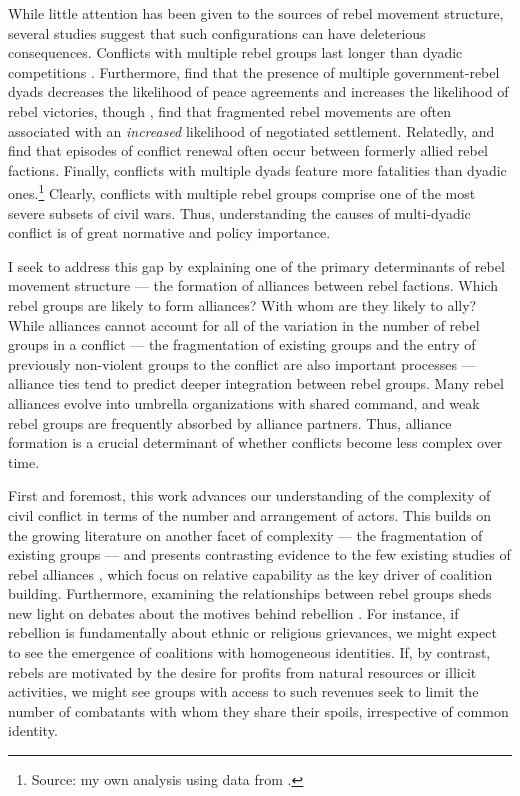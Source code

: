 \documentclass[12pt,]{book}
\let\rmarkdownfootnote\footnote%
\def\footnote{\protect\rmarkdownfootnote}
\begin{document}
While little attention has been given to the sources of rebel movement
structure, several studies suggest that such configurations can have
deleterious consequences. Conflicts with multiple rebel groups last
longer than dyadic competitions
\citep{Cunningham2006, Cunningham2009, Akcinaroglu2012a}. Furthermore,
\citet{Cunningham2009} find that the presence of multiple
government-rebel dyads decreases the likelihood of peace agreements and
increases the likelihood of rebel victories, though \citet{Findley2012},
find that fragmented rebel movements are often associated with an
\emph{increased} likelihood of negotiated settlement. Relatedly,
\citet{Atlas1999} and \citet{Zeigler2016} find that episodes of conflict
renewal often occur between formerly allied rebel factions. Finally,
conflicts with multiple dyads feature more fatalities than dyadic
ones.\footnote{Source: my own analysis using data from
  \citet{Sundberg2008a}.} Clearly, conflicts with multiple rebel groups
comprise one of the most severe subsets of civil wars. Thus,
understanding the causes of multi-dyadic conflict is of great normative
and policy importance.

I seek to address this gap by explaining one of the primary determinants
of rebel movement structure --- the formation of alliances between rebel
factions. Which rebel groups are likely to form alliances? With whom are
they likely to ally? While alliances cannot account for all of the
variation in the number of rebel groups in a conflict --- the
fragmentation of existing groups and the entry of previously non-violent
groups to the conflict are also important processes --- alliance ties
tend to predict deeper integration between rebel groups. Many rebel
alliances evolve into umbrella organizations with shared command, and
weak rebel groups are frequently absorbed by alliance partners. Thus,
alliance formation is a crucial determinant of whether conflicts become
less complex over time.

First and foremost, this work advances our understanding of the
complexity of civil conflict in terms of the number and arrangement of
actors. This builds on the growing literature on another facet of
complexity --- the fragmentation of existing groups
\citep[see][]{Cunningham2009, Pearlman2011a, Staniland2014} --- and
presents contrasting evidence to the few existing studies of rebel
alliances \citep{Christia2012, Bapat2012}, which focus on relative
capability as the key driver of coalition building. Furthermore,
examining the relationships between rebel groups sheds new light on
debates about the motives behind rebellion \citep[e.g.][]{Collier2004}.
For instance, if rebellion is fundamentally about ethnic or religious
grievances, we might expect to see the emergence of coalitions with
homogeneous identities. If, by contrast, rebels are motivated by the
desire for profits from natural resources or illicit activities, we
might see groups with access to such revenues seek to limit the number
of combatants with whom they share their spoils, irrespective of common
identity.
\end{document}
